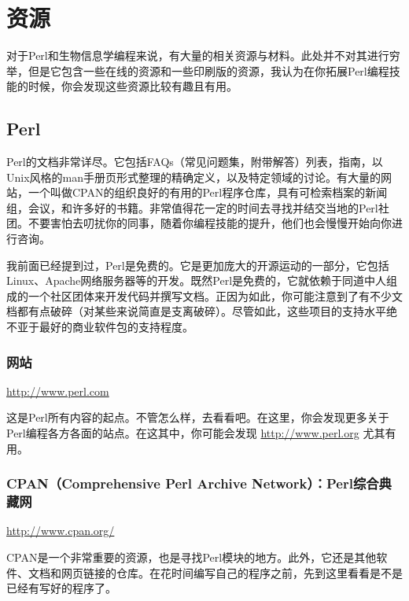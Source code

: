 \chapter{资源}
\label{chap:chapteraa}
\minitoc

对于Perl和生物信息学编程来说，有大量的相关资源与材料。此处并不对其进行穷举，但是它包含一些在线的资源和一些印刷版的资源，我认为在你拓展Perl编程技能的时候，你会发现这些资源比较有趣且有用。

\section{Perl}
Perl的文档非常详尽。它包括FAQs（常见问题集，附带解答）列表，指南，以Unix风格的man手册页形式整理的精确定义，以及特定领域的讨论。有大量的网站，一个叫做CPAN的组织良好的有用的Perl程序仓库，具有可检索档案的新闻组，会议，和许多好的书籍。非常值得花一定的时间去寻找并结交当地的Perl社团。不要害怕去叨扰你的同事，随着你编程技能的提升，他们也会慢慢开始向你进行咨询。

我前面已经提到过，Perl是免费的。它是更加庞大的开源运动的一部分，它包括Linux、Apache网络服务器等的开发。既然Perl是免费的，它就依赖于同道中人组成的一个社区团体来开发代码并撰写文档。正因为如此，你可能注意到了有不少文档都有点破碎（对某些来说简直是支离破碎）。尽管如此，这些项目的支持水平绝不亚于最好的商业软件包的支持程度。

\subsection{网站}
\href{http://www.perl.com}{http://www.perl.com}

\begin{adjustwidth}{1cm}{}
这是Perl所有内容的起点。不管怎么样，去看看吧。在这里，你会发现更多关于Perl编程各方各面的站点。在这其中，你可能会发现 \href{http://www.perl.org}{http://www.perl.org} 尤其有用。
\end{adjustwidth}

\subsection{CPAN（Comprehensive Perl Archive Network）：Perl综合典藏网}
\href{http://www.cpan.org/}{http://www.cpan.org/}

\begin{adjustwidth}{1cm}{}
CPAN是一个非常重要的资源，也是寻找Perl模块的地方。此外，它还是其他软件、文档和网页链接的仓库。在花时间编写自己的程序之前，先到这里看看是不是已经有写好的程序了。
\end{adjustwidth}

